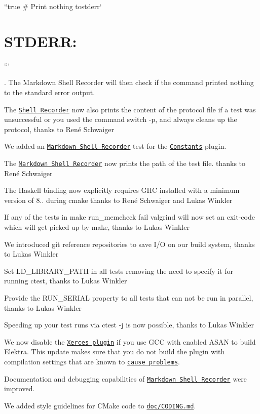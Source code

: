 \begin{DoxyItemize}
``{\ttfamily  true \# Print nothing to}stderr` \section*{S\+T\+D\+E\+RR\+:}

```

. The Markdown Shell Recorder will then check if the command printed nothing to the standard error output.
\item The \href{https://master.libelektra.org/tests/shell/shell_recorder}{\tt Shell Recorder} now also prints the content of the protocol file if a test was unsuccessful or you used the command switch {\ttfamily -\/p}, and always cleans up the protocol, thanks to René Schwaiger
\item We added an \href{https://master.libelektra.org/tests/shell/shell_recorder/tutorial_wrapper}{\tt Markdown Shell Recorder} test for the \href{http://libelektra.org/plugins/constants}{\tt Constants} plugin.
\item The \href{https://master.libelektra.org/tests/shell/shell_recorder/tutorial_wrapper}{\tt Markdown Shell Recorder} now prints the path of the test file. thanks to René Schwaiger
\item The Haskell binding now explicitly requires G\+HC installed with a minimum version of 8.. during cmake thanks to René Schwaiger and Lukas Winkler
\item If any of the tests in {\ttfamily make run\+\_\+memcheck} fail valgrind will now set an exit-\/code which will get picked up by make, thanks to Lukas Winkler
\item We introduced git reference repositories to save I/O on our build system, thanks to Lukas Winkler
\item Set {\ttfamily L\+D\+\_\+\+L\+I\+B\+R\+A\+R\+Y\+\_\+\+P\+A\+TH} in all tests removing the need to specify it for running ctest, thanks to Lukas Winkler
\item Provide the {\ttfamily R\+U\+N\+\_\+\+S\+E\+R\+I\+AL} property to all tests that can not be run in parallel, thanks to Lukas Winkler
\item Speeding up your test runs via {\ttfamily ctest -\/j} is now possible, thanks to Lukas Winkler
\item We now disable the \href{http://libelektra.org/plugins/xerces}{\tt Xerces plugin} if you use G\+CC with enabled A\+S\+AN to build Elektra. This update makes sure that you do not build the plugin with compilation settings that are known to \href{https://github.com/ElektraInitiative/libelektra/issues/1895}{\tt cause problems}.
\item Documentation and debugging capabilities of \href{https://master.libelektra.org/tests/shell/shell_recorder/tutorial_wrapper}{\tt Markdown Shell Recorder} were improved.
\item We added style guidelines for C\+Make code to \href{https://github.com/ElektraInitiative/libelektra/blob/master/doc/CODING.md#cmake-guidelines}{\tt {\ttfamily doc/\+C\+O\+D\+I\+N\+G.\+md}}.
\end{DoxyItemize}

